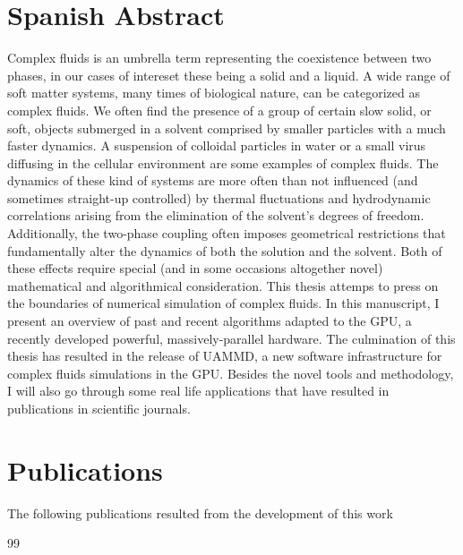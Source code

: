 \documentclass[ twoside,openright,titlepage,numbers=noenddot,%
headinclude,footinclude,cleardoublepage=empty,abstract=on,
BCOR=5mm,paper=a4,fontsize=11pt, dvipsnames
]{scrreprt}
\begin{document}
\cleardoublepage
\newpage

\chapter*{Spanish Abstract}
Complex fluids is an umbrella term representing the coexistence between two phases, in our cases of intereset these being a solid and a liquid. A wide range of soft matter systems, many times of biological nature, can be categorized as complex fluids. We often find the presence of a group of certain slow solid, or soft, objects submerged in a solvent comprised by smaller particles with a much faster dynamics. A suspension of colloidal particles in water or a small virus diffusing in the cellular environment are some examples of complex fluids. The dynamics of these kind of systems are more often than not influenced (and sometimes straight-up controlled) by thermal fluctuations and hydrodynamic correlations arising from the elimination of the solvent's degrees of freedom. Additionally, the two-phase coupling often imposes geometrical restrictions that fundamentally alter the dynamics of both the solution and the solvent. Both of these effects require special (and in some occasions altogether novel) mathematical and algorithmical consideration. This thesis attemps to press on the boundaries of numerical simulation of complex fluids. In this manuscript, I present an overview of past and recent algorithms adapted to the GPU, a recently developed powerful, massively-parallel hardware. The culmination of this thesis has resulted in the release of UAMMD, a new software infrastructure for complex fluids simulations in the GPU. Besides the novel tools and methodology, I will also go through some real life applications that have resulted in publications in scientific journals.
\cleardoublepage
\newpage
{}
\chapter*{Publications}

The following publications resulted from the development of this work

\begin{refsection}[ownpubs]
  \small
    \expandafter\def\csname blx@maxbibnames\endcsname{99}%
    \nocite{*} %
    \printbibliography[heading=none]
\end{refsection}
\end{document}

